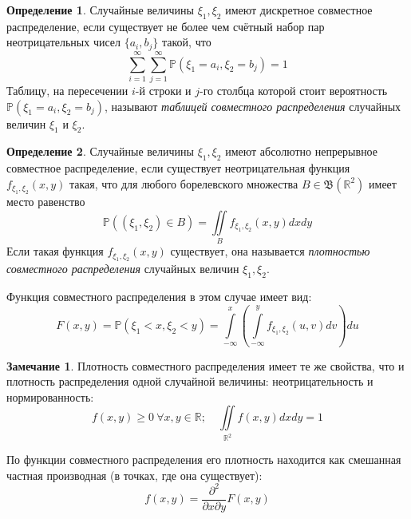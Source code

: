 \documentclass[oneside,final,14pt]{extreport}
\theoremstyle{plain}
\theoremstyle{definition}
\newtheorem*{defn}{Определение}
\newtheorem*{rmrk}{Замечание}
\theoremstyle{named}
\begin{document}
\begin{defn}
    Случайные величины $\xi_1, \xi_2$ имеют дискретное совместное распределение, если существует не более чем счётный набор пар неотрицательных чисел $\{a_{i}, b_{j}\}$ такой, что
    \begin{equation*}
        \sum\limits_{i=1}^{\infty} \sum\limits_{j=1}^{\infty} \mathbb{P}\left(\xi_{1}=a_{i}, \xi_{2}=b_{j}\right)=1
    \end{equation*}
    Таблицу, на пересечении $i$-й строки и $j$-го столбца которой стоит вероятность $\mathbb{P}\left(\xi_{1}=a_{i}, \xi_{2}=b_{j}\right)$, называют {\it таблицей совместного распределения} случайных величин $\xi_1$ и $\xi_2$.
\end{defn}
\begin{defn}
    Случайные величины $\xi_1, \xi_2$ имеют абсолютно непрерывное совместное распределение, если существует неотрицательная функция $f_{\xi_{1}, \xi_{2}}(x, y)$ такая, что для любого борелевского множества $B \in \mathfrak{B}\left(\mathbb{R}^{2}\right)$ имеет место равенство
    \begin{equation*}
        \mathbb{P}\left(\left(\xi_{1}, \xi_{2}\right) \in B\right)=\iint\limits_{B} f_{\xi_{1}, \xi_{2}}(x, y) d x d y
    \end{equation*}
    Если такая функция $f_{\xi_{1}, \xi_{2}}(x, y)$ существует, она называется {\it плотностью совместного распределения} случайных величин $\xi_1, \xi_2$.
    
    Функция совместного распределения в этом случае имеет вид:
    \begin{equation*}
        F(x, y)=\mathbb{P}(\xi_{1}<x, \xi_{2}<y)=\int\limits_{-\infty}^{x}\left(\int\limits_{-\infty}^{y} f_{\xi_{1}, \xi_{2}}(u, v) d v\right) d u
    \end{equation*}
\end{defn}

\begin{rmrk}
    Плотность совместного распределения имеет те же свойства, что и плотность распределения одной случайной величины: неотрицательность и нормированность:
    \begin{equation*}
        f(x, y) \geqslant 0~ \forall x,y \in \mathbb{R}; \quad \iint\limits_{\mathbb{R}^{2}} f(x, y) dx dy = 1
    \end{equation*}

    По функции совместного распределения его плотность находится как смешанная частная производная (в точках, где она существует):
    \begin{equation*}
        f(x, y)=\frac{\partial^{2}}{\partial x \partial y} F(x, y)
    \end{equation*}
\end{rmrk}
\end{document}
